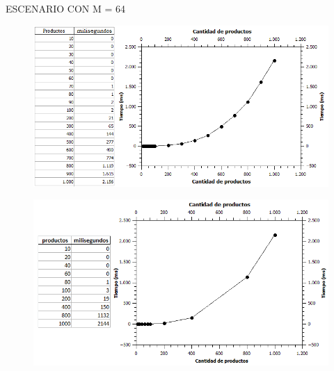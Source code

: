 \documentclass[10pt,a4paper]{article}
\begin{document}
 
\newpage\indent ESCENARIO CON M = 64
	\begin{figure}[h]
		\begin{center}
		   \includegraphics[scale=0.50]{experimentos/random/graficos/64.png}
		\end{center}
	\end{figure}
	\begin{figure}[h]
		\begin{center}
		   \includegraphics[scale=0.50]{sincota/graficos/64.png}
		\end{center}
	\end{figure}
\end{document}

